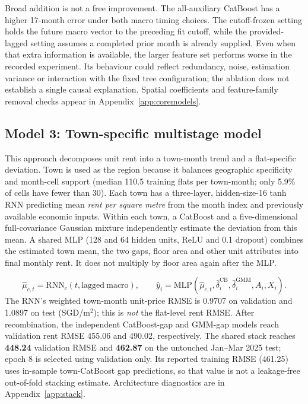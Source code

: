 \documentclass[10pt,a4paper]{article}
\begin{document}
Broad addition is not a free improvement. The all-auxiliary CatBoost has a higher 17-month error under both macro timing choices. The cutoff-frozen setting holds the future macro vector to the preceding fit cutoff, while the provided-lagged setting assumes a completed prior month is already supplied. Even when that extra information is available, the larger feature set performs worse in the recorded experiment. Its behaviour could reflect redundancy, noise, estimation variance or interaction with the fixed tree configuration; the ablation does not establish a single causal explanation. Spatial coefficients and feature-family removal checks appear in Appendix~\ref{app:coremodels}.


\subsection{Model 3: Town-specific multistage model}\label{sec:m3}
This approach decomposes unit rent into a town-month trend and a flat-specific deviation. Town is used as the region because it balances geographic specificity and month-cell support (median 110.5 training flats per town-month; only 5.9\% of cells have fewer than 30). Each town has a three-layer, hidden-size-16 tanh RNN predicting mean \emph{rent per square metre} from the month index and previously available economic inputs. Within each town, a CatBoost and a five-dimensional full-covariance Gaussian mixture independently estimate the deviation from this mean. A shared MLP (128 and 64 hidden units, ReLU and 0.1 dropout) combines the estimated town mean, the two gaps, floor area and other unit attributes into final monthly rent. It does not multiply by floor area again after the MLP.

\begin{equation}\label{eq:stackmain}
\hat\mu_{c,t}=\mathrm{RNN}_c(t,\mathrm{lagged\ macro}),\qquad
\hat y_i=\mathrm{MLP}(\hat\mu_{c,t},\hat\delta^{\mathrm{CB}}_i,\hat\delta^{\mathrm{GMM}}_i,A_i,X_i).
\end{equation}
The RNN's weighted town-month unit-price RMSE is 0.9707 on validation and 1.0897 on test (SGD/m$^2$); this is \emph{not} the flat-level rent RMSE. After recombination, the independent CatBoost-gap and GMM-gap models reach validation rent RMSE 455.06 and 490.02, respectively. The shared stack reaches \textbf{448.24} validation RMSE and \textbf{462.87} on the untouched Jan--Mar 2025 test; epoch 8 is selected using validation only. Its reported training RMSE (461.25) uses in-sample town-CatBoost gap predictions, so that value is not a leakage-free out-of-fold stacking estimate. Architecture diagnostics are in Appendix~\ref{app:stack}.
\end{document}
